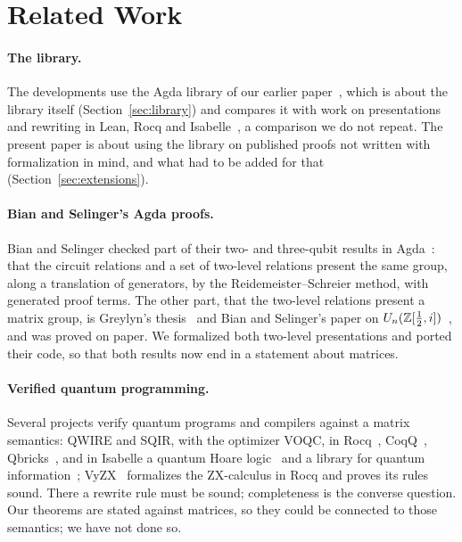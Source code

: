 \section{Related Work}\label{sec:related}

\paragraph{The library.} The developments use the Agda library of our
earlier paper~\cite{anonymous2027popl}, which is about the library
itself (Section~\ref{sec:library}) and compares it with work on
presentations and rewriting in Lean, Rocq and
Isabelle~\cite{mathlib-doc-presented,gonthier2013oddorder,kharim2023freegroups,sternagel2013kb},
a comparison we do not repeat. The present paper is about using the
library on published proofs not written with formalization in mind,
and what had to be added for that (Section~\ref{sec:extensions}).

\paragraph{Bian and Selinger's Agda proofs.} Bian and Selinger checked
part of their two- and three-qubit results in
Agda~\cite{bian2023cliffordt2,bian2023cliffordcs3,bian2023thesis}:
that the circuit relations and a set of two-level relations present
the same group, along a translation of generators, by the
Reidemeister--Schreier method, with generated proof terms. The other
part, that the two-level relations present a matrix group, is
Greylyn's thesis~\cite{greylyn2014} and Bian and Selinger's paper on
$U_n(\mathbb{Z}[\frac12,i])$~\cite{bian2021un}, and was proved on paper. We
formalized both two-level presentations and ported their code, so that
both results now end in a statement about matrices.

\paragraph{Verified quantum programming.} Several projects verify
quantum programs and compilers against a matrix semantics: QWIRE and
SQIR, with the optimizer VOQC, in
Rocq~\cite{paykin2017qwire,rand2018qwirepractice,hietala2021voqc,hietala2021proving},
CoqQ~\cite{zhou2023coqq}, Qbricks~\cite{chareton2021qbricks}, and in
Isabelle a quantum Hoare logic~\cite{liu2019quantum} and a library for
quantum information~\cite{bordg2020dirac}; VyZX~\cite{lehmann2025vyzx}
formalizes the ZX-calculus in Rocq and proves its rules sound. There a
rewrite rule must be sound; completeness is the converse question. Our
theorems are stated against matrices, so they could be connected to
those semantics; we have not done so.

